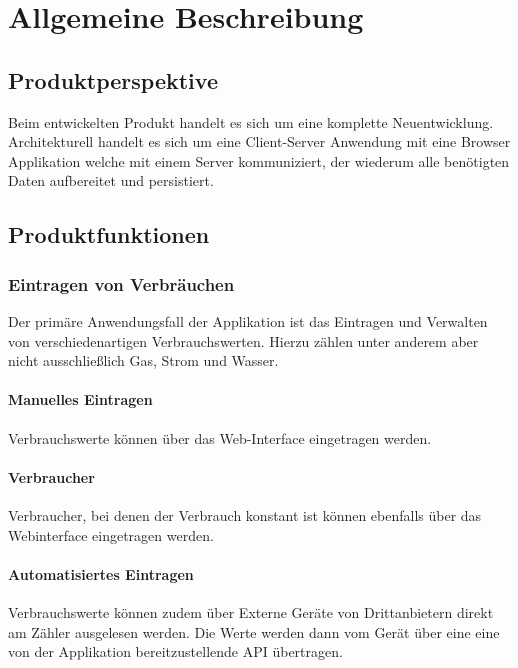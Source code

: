 \section{Allgemeine Beschreibung}


\subsection{Produktperspektive}


Beim entwickelten Produkt handelt es sich um eine komplette Neuentwicklung. Architekturell handelt es sich um eine Client-Server Anwendung mit eine Browser Applikation welche mit einem Server kommuniziert, der wiederum alle benötigten Daten aufbereitet und persistiert.

\subsection{Produktfunktionen}

\subsubsection{Eintragen von Verbräuchen}

Der primäre Anwendungsfall der Applikation ist das Eintragen und Verwalten von verschiedenartigen Verbrauchswerten. Hierzu zählen unter anderem aber nicht ausschließlich Gas, Strom und Wasser.

\paragraph{Manuelles Eintragen}

Verbrauchswerte können über das Web-Interface eingetragen werden.

\paragraph{Verbraucher}
Verbraucher, bei denen der Verbrauch konstant ist können ebenfalls über das Webinterface eingetragen werden.

\paragraph{Automatisiertes Eintragen}
\label{autom_eintragen}

Verbrauchswerte können zudem über Externe Geräte von Drittanbietern direkt am Zähler ausgelesen werden. Die Werte werden dann vom Gerät über eine eine von der Applikation bereitzustellende API übertragen.

